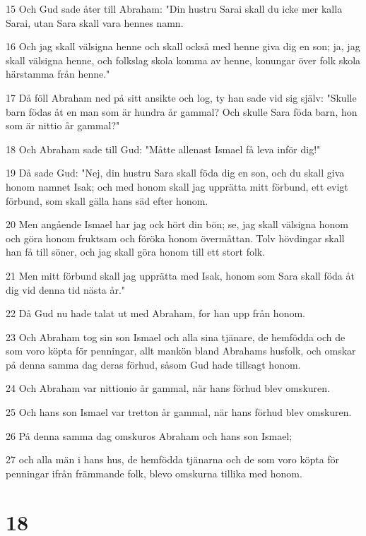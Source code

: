 \par 15 Och Gud sade åter till Abraham: "Din hustru Sarai skall du icke mer kalla Sarai, utan Sara skall vara hennes namn.
\par 16 Och jag skall välsigna henne och skall också med henne giva dig en son; ja, jag skall välsigna henne, och folkslag skola komma av henne, konungar över folk skola härstamma från henne."
\par 17 Då föll Abraham ned på sitt ansikte och log, ty han sade vid sig själv: "Skulle barn födas åt en man som är hundra år gammal? Och skulle Sara föda barn, hon som är nittio år gammal?"
\par 18 Och Abraham sade till Gud: "Måtte allenast Ismael få leva inför dig!"
\par 19 Då sade Gud: "Nej, din hustru Sara skall föda dig en son, och du skall giva honom namnet Isak; och med honom skall jag upprätta mitt förbund, ett evigt förbund, som skall gälla hans säd efter honom.
\par 20 Men angående Ismael har jag ock hört din bön; se, jag skall välsigna honom och göra honom fruktsam och föröka honom övermåttan. Tolv hövdingar skall han få till söner, och jag skall göra honom till ett stort folk.
\par 21 Men mitt förbund skall jag upprätta med Isak, honom som Sara skall föda åt dig vid denna tid nästa år."
\par 22 Då Gud nu hade talat ut med Abraham, for han upp från honom.
\par 23 Och Abraham tog sin son Ismael och alla sina tjänare, de hemfödda och de som voro köpta för penningar, allt mankön bland Abrahams husfolk, och omskar på denna samma dag deras förhud, såsom Gud hade tillsagt honom.
\par 24 Och Abraham var nittionio år gammal, när hans förhud blev omskuren.
\par 25 Och hans son Ismael var tretton år gammal, när hans förhud blev omskuren.
\par 26 På denna samma dag omskuros Abraham och hans son Ismael;
\par 27 och alla män i hans hus, de hemfödda tjänarna och de som voro köpta för penningar ifrån främmande folk, blevo omskurna tillika med honom.

\chapter{18}

